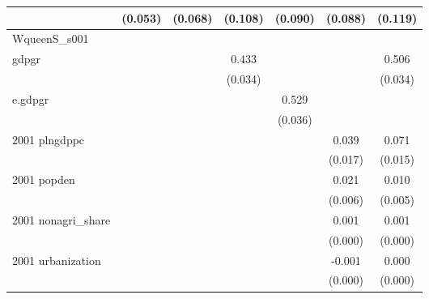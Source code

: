 \begin{table}[htbp]
\begin{tabular}{l*{6}{c}}
                    &     (0.053)         &     (0.068)         &     (0.108)         &     (0.090)         &     (0.088)         &     (0.119)         \\
\hline
WqueenS\_s001        &                     &                     &                     &                     &                     &                     \\
gdpgr               &                     &                     &       0.433\sym{***}&                     &                     &       0.506\sym{***}\\
                    &                     &                     &     (0.034)         &                     &                     &     (0.034)         \\
e.gdpgr             &                     &                     &                     &       0.529\sym{***}&                     &                     \\
                    &                     &                     &                     &     (0.036)         &                     &                     \\
2001 plngdppc       &                     &                     &                     &                     &       0.039\sym{**} &       0.071\sym{***}\\
                    &                     &                     &                     &                     &     (0.017)         &     (0.015)         \\
2001 popden         &                     &                     &                     &                     &       0.021\sym{***}&       0.010\sym{*}  \\
                    &                     &                     &                     &                     &     (0.006)         &     (0.005)         \\
2001 nonagri\_share  &                     &                     &                     &                     &       0.001\sym{**} &       0.001\sym{*}  \\
                    &                     &                     &                     &                     &     (0.000)         &     (0.000)         \\
2001 urbanization   &                     &                     &                     &                     &      -0.001\sym{***}&       0.000         \\
                    &                     &                     &                     &                     &     (0.000)         &     (0.000)         \\

\end{tabular}
\end{table}
